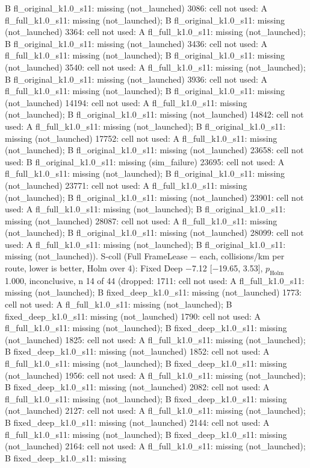 \begin{table}[t]
{B fl\_original\_k1.0\_s11: missing (not\_launched) \textbar{} 3086: cell not used: A fl\_full\_k1.0\_s11: missing (not\_launched); B fl\_original\_k1.0\_s11: missing (not\_launched) \textbar{} 3364: cell not used: A fl\_full\_k1.0\_s11: missing (not\_launched); B fl\_original\_k1.0\_s11: missing (not\_launched) \textbar{} 3436: cell not used: A fl\_full\_k1.0\_s11: missing (not\_launched); B fl\_original\_k1.0\_s11: missing (not\_launched) \textbar{} 3540: cell not used: A fl\_full\_k1.0\_s11: missing (not\_launched); B fl\_original\_k1.0\_s11: missing (not\_launched) \textbar{} 3936: cell not used: A fl\_full\_k1.0\_s11: missing (not\_launched); B fl\_original\_k1.0\_s11: missing (not\_launched) \textbar{} 14194: cell not used: A fl\_full\_k1.0\_s11: missing (not\_launched); B fl\_original\_k1.0\_s11: missing (not\_launched) \textbar{} 14842: cell not used: A fl\_full\_k1.0\_s11: missing (not\_launched); B fl\_original\_k1.0\_s11: missing (not\_launched) \textbar{} 17752: cell not used: A fl\_full\_k1.0\_s11: missing (not\_launched); B fl\_original\_k1.0\_s11: missing (not\_launched) \textbar{} 23658: cell not used: B fl\_original\_k1.0\_s11: missing (sim\_failure) \textbar{} 23695: cell not used: A fl\_full\_k1.0\_s11: missing (not\_launched); B fl\_original\_k1.0\_s11: missing (not\_launched) \textbar{} 23771: cell not used: A fl\_full\_k1.0\_s11: missing (not\_launched); B fl\_original\_k1.0\_s11: missing (not\_launched) \textbar{} 23901: cell not used: A fl\_full\_k1.0\_s11: missing (not\_launched); B fl\_original\_k1.0\_s11: missing (not\_launched) \textbar{} 28087: cell not used: A fl\_full\_k1.0\_s11: missing (not\_launched); B fl\_original\_k1.0\_s11: missing (not\_launched) \textbar{} 28099: cell not used: A fl\_full\_k1.0\_s11: missing (not\_launched); B fl\_original\_k1.0\_s11: missing (not\_launched)). S-coll (Full FrameLease $-$ each, collisions/km per route, lower is better, Holm over 4): Fixed Deep $-$7.12 [$-$19.65, 3.53], $p_\mathrm{Holm}$ 1.000, inconclusive, n 14 of 44 (dropped: 1711: cell not used: A fl\_full\_k1.0\_s11: missing (not\_launched); B fixed\_deep\_k1.0\_s11: missing (not\_launched) \textbar{} 1773: cell not used: A fl\_full\_k1.0\_s11: missing (not\_launched); B fixed\_deep\_k1.0\_s11: missing (not\_launched) \textbar{} 1790: cell not used: A fl\_full\_k1.0\_s11: missing (not\_launched); B fixed\_deep\_k1.0\_s11: missing (not\_launched) \textbar{} 1825: cell not used: A fl\_full\_k1.0\_s11: missing (not\_launched); B fixed\_deep\_k1.0\_s11: missing (not\_launched) \textbar{} 1852: cell not used: A fl\_full\_k1.0\_s11: missing (not\_launched); B fixed\_deep\_k1.0\_s11: missing (not\_launched) \textbar{} 1956: cell not used: A fl\_full\_k1.0\_s11: missing (not\_launched); B fixed\_deep\_k1.0\_s11: missing (not\_launched) \textbar{} 2082: cell not used: A fl\_full\_k1.0\_s11: missing (not\_launched); B fixed\_deep\_k1.0\_s11: missing (not\_launched) \textbar{} 2127: cell not used: A fl\_full\_k1.0\_s11: missing (not\_launched); B fixed\_deep\_k1.0\_s11: missing (not\_launched) \textbar{} 2144: cell not used: A fl\_full\_k1.0\_s11: missing (not\_launched); B fixed\_deep\_k1.0\_s11: missing (not\_launched) \textbar{} 2164: cell not used: A fl\_full\_k1.0\_s11: missing (not\_launched); B fixed\_deep\_k1.0\_s11: missing }
\end{table}
